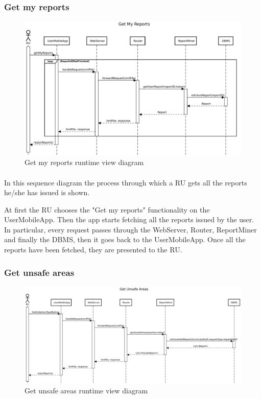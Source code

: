 				\subsubsection{Get my reports}
					\begin{figure}[!h]
						\centering
						\includegraphics[width=\textwidth]{images/DD2/RuntimeView/RU/GetMyReports.pdf}
						\caption{Get my reports runtime view diagram}
					\end{figure}
					\paragraph{}
						In this sequence diagram the process through which a RU gets all the reports he/she has issued is shown.
						
						At first the RU chooses the "Get my reports" functionality on the UserMobileApp. Then the app starts fetching all the reports issued by the user. In particular, every request passes through the WebServer, Router, ReportMiner and finally the DBMS, then it goes back to the UserMobileApp. Once all the reports have been fetched, they are presented to the RU.
				\clearpage
				\subsubsection{Get unsafe areas}
					\begin{figure}[!h]
						\centering
						\includegraphics[width=\textwidth]{images/DD2/RuntimeView/RU/GetUnsafeAreas.pdf}
						\caption{Get unsafe areas runtime view diagram}
					\end{figure}
